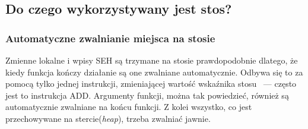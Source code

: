 \subsection{Do czego wykorzystywany jest stos?}








\subsubsection{Automatyczne zwalnianie miejsca na stosie}
Zmienne lokalne i wpisy SEH są trzymane na stosie prawdopodobnie dlatego, że kiedy funkcja kończy działanie są one zwalniane automatycznie. Odbywa się to za pomocą tylko jednej instrukcji, zmieniającej wartość wskaźnika stosu ~--- często jest to  instrukcja ADD.
Argumenty funkcji, można tak powiedzieć, również są automatycznie zwalniane na końcu funkcji.
Z kolei wszystko, co jest przechowywane na stercie(\emph{heap}), trzeba zwalniać jawnie.





